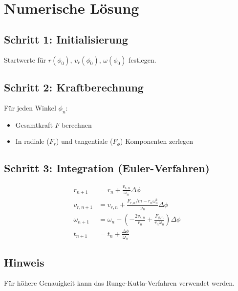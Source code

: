\section{Numerische Lösung}
\subsection{Schritt 1: Initialisierung}
Startwerte für $r(\phi_0)$, $v_r(\phi_0)$, $\omega(\phi_0)$ festlegen.

\subsection{Schritt 2: Kraftberechnung}
Für jeden Winkel $\phi_n$:
\begin{itemize}
\item Gesamtkraft $F$ berechnen
\item In radiale ($F_r$) und tangentiale ($F_\phi$) Komponenten zerlegen
\end{itemize}

\subsection{Schritt 3: Integration (Euler-Verfahren)}
\[
\begin{aligned}
r_{n+1} &= r_n + \frac{v_{r,n}}{\omega_n} \Delta\phi \\
v_{r,n+1} &= v_{r,n} + \frac{F_{r,n}/m - r_n\omega_n^2}{\omega_n} \Delta\phi \\
\omega_{n+1} &= \omega_n + \left(-\frac{2v_{r,n}}{r_n} + \frac{F_{\phi,n}}{r_n\omega_n}\right) \Delta\phi \\
t_{n+1} &= t_n + \frac{\Delta\phi}{\omega_n}
\end{aligned}
\]

\subsection{Hinweis}
Für höhere Genauigkeit kann das Runge-Kutta-Verfahren verwendet werden.